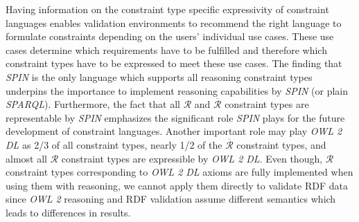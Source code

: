 \documentclass{acm_proc_article-sp}
\begin{document}
Having information on the constraint type specific expressivity of constraint languages 
enables validation environments to recommend the right language to formulate constraints depending on the users' individual use cases.
These use cases determine which requirements have to be fulfilled and therefore which constraint types have to be expressed to meet these use cases.
The finding that \emph{SPIN} is the only language which supports all reasoning constraint types 
underpins the importance to implement reasoning capabilities by \emph{SPIN} (or plain \emph{SPARQL}).
Furthermore, the fact that all $\mathcal{R}$ and $\overline{\mathcal{R}}$ constraint types are representable by \emph{SPIN} 
emphasizes the significant role \emph{SPIN} plays for the future development of constraint languages.
Another important role may play \emph{OWL 2 DL} as 2/3 of all constraint types, 
nearly 1/2 of the $\overline{\mathcal{R}}$ constraint types, and
almost all $\mathcal{R}$ constraint types
are expressible by \emph{OWL 2 DL}.
Even though, $\mathcal{R}$ constraint types corresponding to \emph{OWL 2 DL} axioms are fully implemented when using them with reasoning,
we cannot apply them directly to validate RDF data since \emph{OWL 2} reasoning and RDF validation assume different semantics which leads to differences in results. 

%
%

\end{document}

